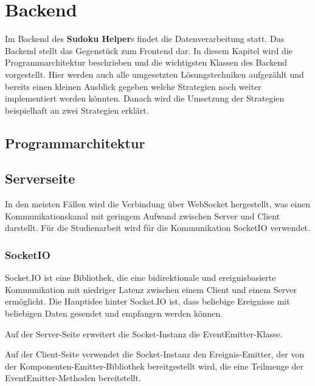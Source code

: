 
\chapter{Backend}

Im Backend des \textbf{Sudoku Helper}s findet die Datenverarbeitung statt. Das Backend stellt das Gegenstück zum Frontend dar. In diesem Kapitel wird die Programmarchitektur beschrieben und die wichtigsten Klassen des Backend vorgestellt. Hier werden auch alle umgesetzten Lösungstechniken aufgezählt und bereits einen kleinen Ausblick gegeben welche Strategien noch weiter implementiert werden könnten. Danach wird die Umsetzung der Strategien beispielhaft an zwei Strategien erklärt.


\section{Programmarchitektur}


\section{Serverseite}


In den meisten Fällen wird die Verbindung über WebSocket hergestellt, was einen Kommunikationskanal mit geringem Aufwand zwischen Server und Client darstellt. Für die Studienarbeit wird für die Kommunikation SocketIO verwendet. 

\subsection{SocketIO}

Socket.IO ist eine Bibliothek, die eine bidirektionale und ereignisbasierte Kommunikation mit niedriger Latenz zwischen einem Client und einem Server ermöglicht. Die Hauptidee hinter Socket.IO ist, dass beliebige Ereignisse mit beliebigen Daten gesendet und empfangen werden können.

Auf der Server-Seite erweitert die Socket-Instanz die EventEmitter-Klasse.

Auf der Client-Seite verwendet die Socket-Instanz den Ereignis-Emitter, der von der Komponenten-Emitter-Bibliothek bereitgestellt wird, die eine Teilmenge der EventEmitter-Methoden bereitstellt.

